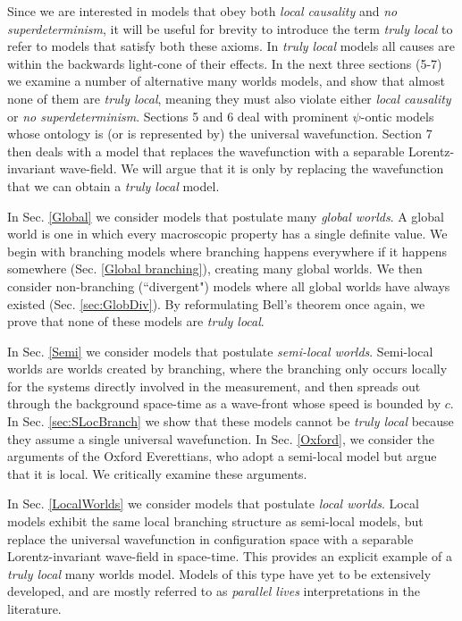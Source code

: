 \documentclass[12pt]{article}
\begin{document}
Since we are interested in models that obey both \textit{local causality} and \textit{no superdeterminism}, it will be useful for brevity to introduce the term \textit{truly local} to refer to models that satisfy both these axioms. In \textit{truly local} models all causes are within the backwards light-cone of their effects. In the next three sections (5-7) we examine a number of alternative many worlds models, and show that almost none of them are \textit{truly local}, meaning they must also violate either \textit{local causality} or \textit{no superdeterminism}. Sections 5 and 6 deal with prominent $\psi$-ontic models whose ontology is (or is represented by) the universal wavefunction. Section 7 then deals with a model that replaces the wavefunction with a separable Lorentz-invariant wave-field. We will argue that it is only by replacing the wavefunction that we can obtain a \textit{truly local} model.

In Sec. \ref{Global} we consider models that postulate many \textit{global worlds}. A global world is one in which every macroscopic property has a single definite value. We begin with branching models where branching happens everywhere if it happens somewhere (Sec. \ref{Global branching}), creating many global worlds. We then consider non-branching (``divergent") models where all global worlds have always existed (Sec. \ref{sec:GlobDiv}). By reformulating Bell's theorem once again, we prove that none of these models are \textit{truly local}.

In Sec. \ref{Semi} we consider models that postulate \textit{semi-local worlds}. Semi-local worlds are worlds created by branching, where the branching only occurs locally for the systems directly involved in the measurement, and then spreads out through the background space-time as a wave-front whose speed is bounded by $c$. In Sec. \ref{sec:SLocBranch} we show that these models cannot be \textit{truly local} because they assume a single universal wavefunction. In Sec. \ref{Oxford}, we consider the arguments of the Oxford Everettians, who adopt a semi-local model but argue that it is local. We critically examine these arguments.    


In Sec. \ref{LocalWorlds} we consider models that postulate \textit{local worlds}. Local models exhibit the same local branching structure as semi-local models, but replace the universal wavefunction in configuration space with a separable Lorentz-invariant wave-field in space-time. This provides an explicit example of a \textit{truly local} many worlds model.  Models of this type have yet to be extensively developed, and are mostly referred to as \textit{parallel lives} interpretations in the literature.
\end{document}
